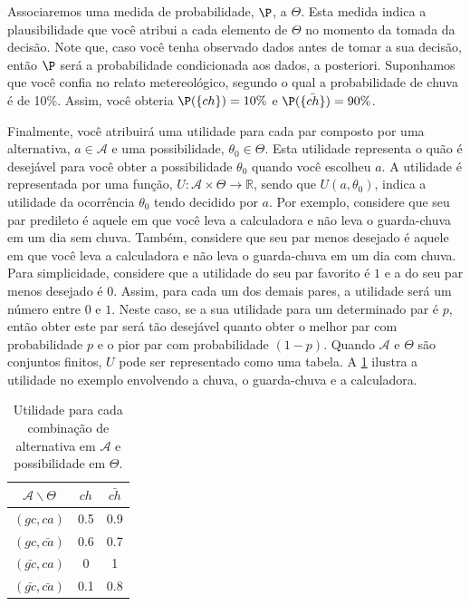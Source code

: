 Associaremos uma medida de probabilidade, $\P$, a $\Theta$.
Esta medida indica a plausibilidade que você atribui a cada
elemento de $\Theta$ no momento da tomada da decisão.
Note que, caso você tenha observado dados antes
de tomar a sua decisão, então
$\P$ será a probabilidade condicionada aos dados,
a posteriori.
Suponhamos que você confia no relato metereológico, 
segundo o qual a probabilidade de chuva é de 10\%.
Assim, você obteria 
$\P(\{ch\})=10\%$ e $\P(\{\bar{ch}\})=90\%$.

Finalmente, você atribuirá uma utilidade para
cada par composto por uma alternativa,
$a \in \mathcal{A}$ e uma possibilidade,
$\theta_{0} \in \Theta$.
Esta utilidade representa o quão é
desejável para você obter a possibilidade
$\theta_{0}$ quando você escolheu $a$.
A utilidade é representada por uma função, 
$U: \mathcal{A} \times \Theta \rightarrow \mathbb{R}$,
sendo que $U(a,\theta_{0})$, indica a utilidade da
ocorrência $\theta_{0}$ tendo decidido por $a$.
Por exemplo, considere que seu par predileto é
aquele em que você leva a calculadora e
não leva o guarda-chuva em um dia sem chuva.
Também, considere que seu par menos desejado é
aquele em que você leva a calculadora e
não leva o guarda-chuva em um dia com chuva.
Para simplicidade, considere que a utilidade do
seu par favorito é $1$ e
a do seu par menos desejado é $0$.
Assim, para cada um dos demais pares, 
a utilidade será um número entre $0$ e $1$.
Neste caso, se a sua utilidade para um
determinado par é $p$, então
obter este par será tão desejável quanto
obter o melhor par com probabilidade $p$
e o pior par com probabilidade $(1-p)$.
Quando $\mathcal{A}$ e $\Theta$ são conjuntos finitos,
$U$ pode ser representado como uma tabela.
A \cref{table:utilidade} ilustra a utilidade no
exemplo envolvendo a chuva, o guarda-chuva e
a calculadora.

\begin{table}
 \centering
 \begin{tabular}{|c|c|c|}
  \hline
  $\mathcal{A} \backslash \Theta$	& $ch$ & $\bar{ch}$ \\
  \hline
  $(gc, ca)$ &	0.5 & 0.9 \\
  $(gc, \bar{ca})$ & 0.6 & 0.7 \\
  $(\bar{gc}, ca)$ & 0 & 1 \\
  $(\bar{gc}, \bar{ca})$ & 0.1 & 0.8 \\
  \hline
 \end{tabular}
 \caption{Utilidade para cada combinação de
 alternativa em $\mathcal{A}$ e
 possibilidade em $\Theta$.}
 \label{table:utilidade}
\end{table}

